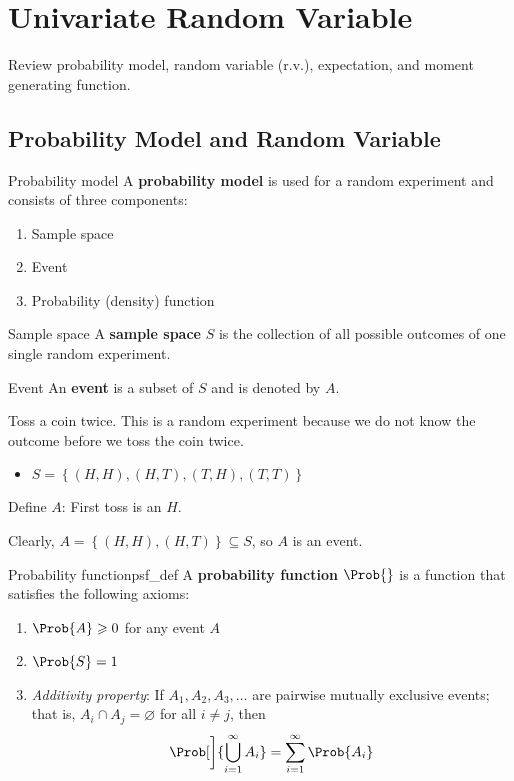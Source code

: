 \setcounter{chapter}{1}
\chapter{Univariate Random Variable}
Review probability model, random variable (r.v.),
expectation, and moment generating function.

\section{Probability Model and Random Variable}
\begin{Definition}{Probability model}{}
    A \textbf{probability model} is used for a random
    experiment and consists of three components:
    \begin{enumerate}[label=(\Roman*)]
        \item Sample space
        \item Event
        \item Probability (density) function
    \end{enumerate}
\end{Definition}

\begin{Definition}{Sample space}{}
    A \textbf{sample space} $ S $ is
    the collection of all possible outcomes of one single
    random experiment.
\end{Definition}
\begin{Definition}{Event}{}
    An \textbf{event} is a subset of $ S $ and is denoted
    by $ A $.
\end{Definition}

\begin{Example}{}{}
    Toss a coin twice. This is a random experiment because
    we do not know the outcome before we toss the coin twice.
    \begin{itemize}
        \item $ S=\left\{ (H,H),(H,T),(T,H),(T,T)\right\} $
    \end{itemize}
    Define $ A $: First toss is an $ H $.

    Clearly, $ A=\left\{ (H,H),(H,T)\right\}\subseteq S $, so $ A $ is an event.
\end{Example}

\begin{Definition}{Probability function}{psf_def}
    A \textbf{probability function} $ \Prob{} $
    is a function that satisfies the following axioms:
    \begin{enumerate}[label=(\Roman*)]
        \item\label{psf_def_1} $ \Prob{A}\geqslant 0 $ for any event $ A $
        \item\label{psf_def_2} $ \Prob{S}=1 $
        \item\label{psf_def_3} \emph{Additivity property}: If $ A_1,A_2,A_3,\ldots $
              are pairwise mutually exclusive events; that is, $ A_i\cap A_j=\varnothing $
              for all $ i\neq j $, then
              \[ \Prob[\bigg]{\bigcup_{i=1}^{\infty}A_i}=\sum\limits_{i=1}^{\infty} \Prob{A_i} \]
    \end{enumerate}
\end{Definition}

